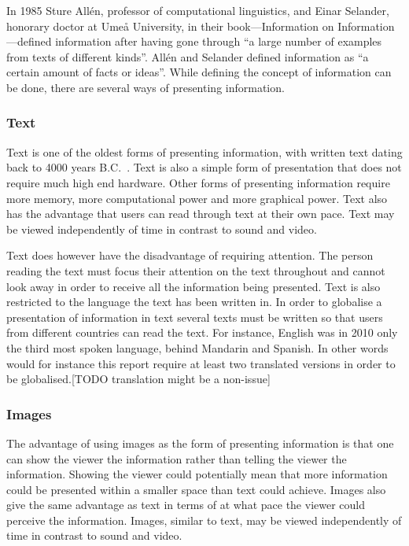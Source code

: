 In 1985 Sture All{\'e}n, professor of computational linguistics, and Einar Selander, honorary doctor at Ume{\aa} University, in their book---Information on Information---defined information after having gone through ``a large number of examples from texts of different kinds''.\cite{informationDef1} All{\'e}n and Selander defined information as ``a certain amount of facts or ideas''. While defining the concept of information can be done, there are several ways of presenting information.

\subsubsection{Text}
Text is one of the oldest forms of presenting information, with written text dating back to 4000 years B.C.~\cite{cuneiform}. Text is also a simple form of presentation that does not require much high end hardware. Other forms of presenting information require more memory, more computational power and more graphical power. Text also has the advantage that users can read through text at their own pace. Text may be viewed independently of time in contrast to sound and video.

Text does however have the disadvantage of requiring attention. The person reading the text must focus their attention on the text throughout and cannot look away in order to receive all the information being presented. Text is also restricted to the language the text has been written in. In order to globalise a presentation of information in text several texts must be written so that users from different countries can read the text. For instance, English was in 2010 only the third most spoken language, behind Mandarin and Spanish.\cite{sprakNe} In other words would for instance this report require at least two translated versions in order to be globalised.[TODO translation might be a non-issue]

\subsubsection{Images}
The advantage of using images as the form of presenting information is that one can show the viewer the information rather than telling the viewer the information. Showing the viewer could potentially mean that more information could be presented within a smaller space than text could achieve. Images also give the same advantage as text in terms of at what pace the viewer could perceive the information. Images, similar to text, may be viewed independently of time in contrast to sound and video.

